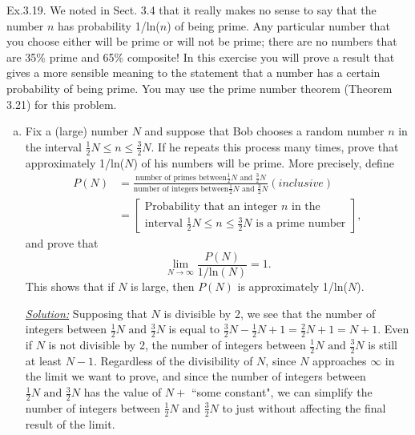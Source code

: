 \documentclass[12pt]{article}
\begin{document}
\noindent Ex.3.19. We noted in Sect. 3.4 that it really makes no sense to say that the number $n$ has probability 1/ln($n$) of being prime. Any particular number that you choose either will be prime or will not be prime; there are no numbers that are 35\% prime and 65\% composite! In this exercise you will prove a result that gives a more sensible meaning to the statement that a number has a certain probability of being prime. You may use the prime number theorem (Theorem 3.21) for this problem.
\begin{enumerate}[a)]




  \item Fix a (large) number $N$ and suppose that Bob chooses a random number $n$ in the interval $\frac{1}{2}N \leq n \leq \frac{3}{2}N$. If he repeats this process many times, prove that approximately 1/ln($N$) of his numbers will be prime. More precisely, define \\
  \begin{align*}
  P(N)&=\frac{\text{number of primes between} \frac{1}{2}N \text{ and } \frac{3}{2}N}{\text{number of integers between} \frac{1}{2}N \text{ and } \frac{3}{2}N} (inclusive)\\
  &=\left[\substack{\text{Probability that an integer } n \text{ in the} \\ \text{interval } \frac{1}{2}N \leq n \leq \frac{3}{2}N \text{ is a prime number}}\right],
  \end{align*}
  and prove that \\
  $$\lim\limits_{N \to \infty} \frac{P(N)}{\text{1/ln}(N)}=1.$$
  This shows that if $N$ is large, then $P(N)$ is approximately 1/ln($N$).
  
  \color{blue}
  \item[\underline{\textit{Solution:}}] Supposing that $N$ is divisible by 2, we see that the number of integers between $\frac{1}{2}N \text{ and } \frac{3}{2}N$ is equal to $\frac{3}{2}N-\frac{1}{2}N+1=\frac{2}{2}N+1=N+1$.  Even if $N$ is not divisible by 2, the number of integers between $\frac{1}{2}N \text{ and } \frac{3}{2}N$ is still at least $N-1$.  Regardless of the divisibility of $N$, since $N$ approaches $\infty$ in the limit we want to prove, and since the number of integers between $\frac{1}{2}N \text{ and } \frac{3}{2}N$ has the value of $N+$ ``some constant", we can simplify the number of integers between $\frac{1}{2}N \text{ and } \frac{3}{2}N$ to just  without affecting the final result of the limit.  \\
  

\end{enumerate}
\end{document}
